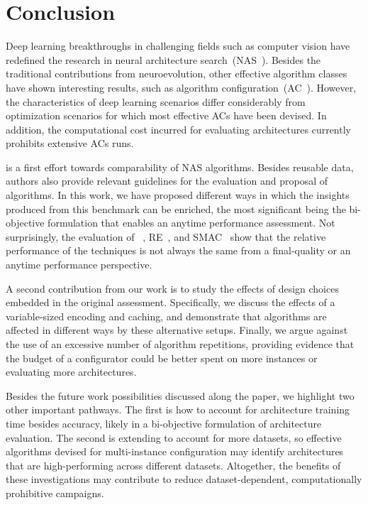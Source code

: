 \section{Conclusion}
\label{sec:conclusion}

Deep learning breakthroughs in challenging fields such as computer vision have redefined the research in neural architecture search~(NAS~\cite{ReaAggHuaLe2019re,ZopLe2017nas,ZopVasShlLeh2018scalable}). Besides the traditional contributions from neuroevolution, other effective algorithm classes have shown interesting results, such as algorithm configuration~(AC~\cite{ElsMetHut2019nas-survey}). However, the characteristics of deep learning scenarios differ considerably from optimization scenarios for which most effective ACs have been devised. In addition, the computational cost incurred for evaluating architectures currently prohibits extensive ACs runs.

\nasbench is a first effort towards comparability of NAS algorithms. Besides reusable data, authors also provide relevant guidelines for the evaluation and proposal of algorithms. In this work, we have proposed different ways in which the insights produced from this benchmark can be enriched, the most significant being the bi-objective formulation that enables an anytime performance assessment. Not surprisingly, the evaluation of \irace~\cite{LopDubPerStuBir2016irace}, RE~\cite{ReaAggHuaLe2019re}, and SMAC~\cite{HutHooLey2011lion} show that the relative performance of the techniques is not always the same from a final-quality or an anytime performance perspective.

A second contribution from our work is to study the effects of design choices embedded in the original \nasbench assessment. Specifically, we discuss the effects of a variable-sized encoding and caching, and demonstrate that algorithms are affected in different ways by these alternative setups. Finally, we argue against the use of an excessive number of algorithm repetitions, providing evidence that the budget of a configurator could be better spent on more instances or evaluating more architectures.

Besides the future work possibilities discussed along the paper, we highlight two other important pathways. The first is how to account for architecture training time besides accuracy, likely in a bi-objective formulation of architecture evaluation. The second is extending \nasbench to account for more datasets, so effective algorithms devised for multi-instance configuration may identify architectures that are high-performing across different datasets. Altogether, the benefits of these investigations may contribute to reduce dataset-dependent, computationally prohibitive campaigns.